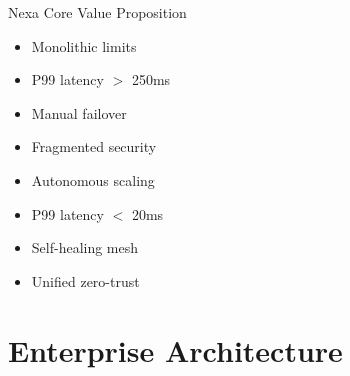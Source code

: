 \documentclass[style=fyma,palette=blue]{powerdot}
\begin{document}
\begin{slide}{Nexa Core Value Proposition}
\begin{minipage}[t]{0.48\textwidth}
\begin{tcolorbox}[title=Legacy Architecture,colframe=red!70!black,colback=red!5]
\small
\begin{itemize}
  \item Monolithic limits
  \item P99 latency $>$ 250ms
  \item Manual failover
  \item Fragmented security
\end{itemize}
\end{tcolorbox}
\end{minipage}%
\hfill
\begin{minipage}[t]{0.48\textwidth}
\begin{tcolorbox}[title=Nexa Next-Gen Engine,colframe=brandTeal,colback=brandTeal!5]
\small
\begin{itemize}
  \item Autonomous scaling
  \item P99 latency $<$ 20ms
  \item Self-healing mesh
  \item Unified zero-trust
\end{itemize}
\end{tcolorbox}
\end{minipage}
\end{slide}

\section{Enterprise Architecture}
\end{document}
